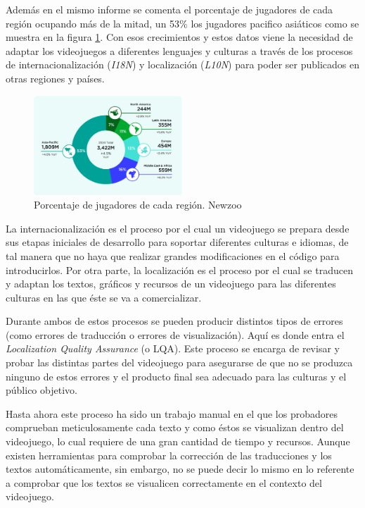 Además en el mismo informe se comenta el porcentaje de jugadores de cada región ocupando más de la mitad, un 53\% los jugadores pacifico asiáticos como se muestra en la figura \ref{fig:NewzooPlayersReg}.
Con esos crecimientos y estos datos viene la necesidad de adaptar los videojuegos a diferentes lenguajes y culturas a través de los procesos de internacionalización ({\textit{I18N}}) y localización ({\textit{L10N}}) para poder ser publicados en otras regiones y países.
\begin{figure}[H]
	\centering
	\includegraphics[width = 0.5\textwidth]{Imagenes/Newzoo_Players_Region.png}
	\caption{Porcentaje de jugadores de cada región. Newzoo}
	\label{fig:NewzooPlayersReg}
\end{figure}
La internacionalización es el proceso por el cual un videojuego se prepara desde sus etapas iniciales de desarrollo para soportar diferentes culturas e idiomas, de tal manera que no haya que realizar grandes modificaciones en el código para introducirlos.
Por otra parte, la localización es el proceso por el cual se traducen y adaptan los textos, gráficos y recursos de un videojuego para las diferentes culturas en las que éste se va a comercializar.

Durante ambos de estos procesos se pueden producir distintos tipos de errores (como errores de traducción o errores de visualización). Aquí es donde entra el \textit{Localization Quality Assurance} (o LQA). Este proceso se encarga de revisar y probar las distintas partes del videojuego para asegurarse de que no se produzca ninguno de estos errores y el producto final sea adecuado para las culturas y el público objetivo.

Hasta ahora este proceso ha sido un trabajo manual en el que los probadores comprueban meticulosamente cada texto y como éstos se visualizan dentro del videojuego, lo cual requiere de una gran cantidad de tiempo y recursos. Aunque existen herramientas para comprobar la corrección de las traducciones y los textos automáticamente, sin embargo, no se puede decir lo mismo en lo referente a comprobar que los textos se visualicen correctamente en el contexto del videojuego.

